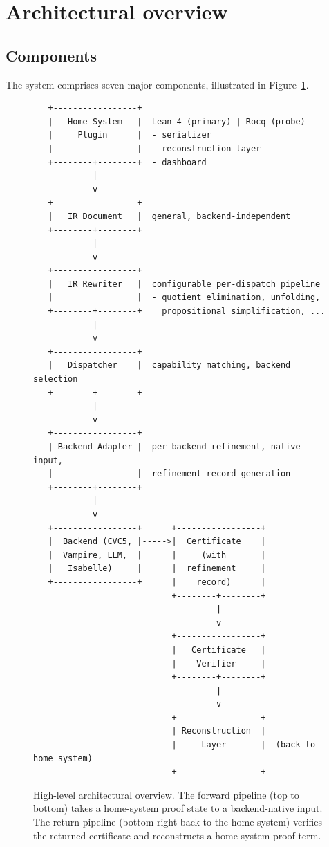 \documentclass[11pt,letterpaper]{article}
\theoremstyle{definition}
\theoremstyle{remark}
\begin{document}
\section{Architectural overview}
\label{sec:overview}

\subsection{Components}

The system comprises seven major components, illustrated in
Figure~\ref{fig:overview}.

\begin{figure}[h]
\centering
\small
\begin{verbatim}
   +-----------------+
   |   Home System   |  Lean 4 (primary) | Rocq (probe)
   |     Plugin      |  - serializer
   |                 |  - reconstruction layer
   +--------+--------+  - dashboard
            |
            v
   +-----------------+
   |   IR Document   |  general, backend-independent
   +--------+--------+
            |
            v
   +-----------------+
   |   IR Rewriter   |  configurable per-dispatch pipeline
   |                 |  - quotient elimination, unfolding,
   +--------+--------+    propositional simplification, ...
            |
            v
   +-----------------+
   |   Dispatcher    |  capability matching, backend selection
   +--------+--------+
            |
            v
   +-----------------+
   | Backend Adapter |  per-backend refinement, native input,
   |                 |  refinement record generation
   +--------+--------+
            |
            v
   +-----------------+      +-----------------+
   |  Backend (CVC5, |----->|  Certificate    |
   |  Vampire, LLM,  |      |     (with       |
   |   Isabelle)     |      |  refinement     |
   +-----------------+      |    record)      |
                            +--------+--------+
                                     |
                                     v
                            +-----------------+
                            |   Certificate   |
                            |    Verifier     |
                            +--------+--------+
                                     |
                                     v
                            +-----------------+
                            | Reconstruction  |
                            |     Layer       |  (back to home system)
                            +-----------------+
\end{verbatim}
\caption{High-level architectural overview. The forward pipeline (top to
bottom) takes a home-system proof state to a backend-native input. The
return pipeline (bottom-right back to the home system) verifies the
returned certificate and reconstructs a home-system proof term.}
\label{fig:overview}
\end{figure}
\end{document}
